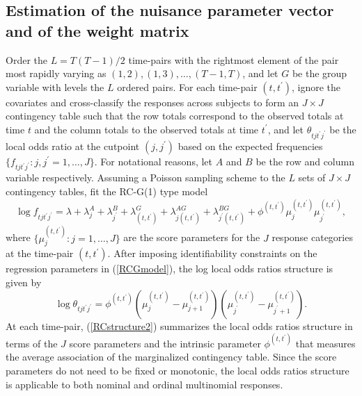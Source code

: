\documentclass[article,shortnames,nojss]{jss}
\begin{document}
\subsection{Estimation of the nuisance parameter vector and of the weight matrix} \label{Alpha}
Order the $L=T(T-1)/2$ time-pairs with the rightmost element of the pair most rapidly varying as $(1,2),(1,3),\ldots,(T-1,T)$, and let $G$ be the group variable with levels the $L$ ordered pairs. For each time-pair $(t,t^{\prime})$, ignore the covariates and cross-classify the responses across subjects to form an $J \times J$ contingency table such that the row totals correspond to the observed totals at time $t$ and the column totals to the observed totals at time $t^{\prime}$, and let $\theta_{tjt^{\prime}j^{\prime}}$ be the local odds ratio at the cutpoint $(j,j^{\prime})$ based on the expected frequencies $\{f_{tjt^{\prime}j^{\prime}}:j,j^{\prime}=1,\ldots,J\}$. For notational reasons, let $A$ and $B$ be the row and column variable respectively. Assuming a Poisson sampling scheme to the $L$ sets of $J \times J$ contingency tables, fit the RC-G(1) type model \citep{Becker1989a}
\begin{equation}
\log f_{tjt^{\prime}j^{\prime}}=\lambda+\lambda^{A}_{j}+\lambda^{B}_{j^{\prime}}+\lambda^{G}_{(t,t^{\prime})}+\lambda^{AG}_{j(t,t^{\prime})}+\lambda^{BG}_{j^{\prime}(t,t^{\prime})}+\phi^{(t,t^{\prime})}\mu^{(t,t^{\prime})}_j \mu^{(t,t^{\prime})}_{j^{\prime}}, 
\label{RCGmodel}
\end{equation}
where $\{\mu^{(t,t^{\prime})}_{j}:j=1,\ldots,J\}$ are the score parameters for the $J$ response categories at the time-pair $(t,t^{\prime})$.
After imposing identifiability constraints on the regression parameters in (\ref{RCGmodel}), the log local odds ratios structure is given by
\begin{equation}
\log \theta_{tjt^{\prime}j^{\prime}}=\phi^{(t,t^{\prime})}\left(\mu^{(t,t^{\prime})}_{j}-\mu^{(t,t^{\prime})}_{j+1}\right)\left(\mu^{(t,t^{\prime})}_{j^{\prime}}-\mu^{(t,t^{\prime})}_{j^{\prime}+1}\right).
\label{RCstructure2}
\end{equation}
At each time-pair, (\ref{RCstructure2}) summarizes the local odds ratios structure in terms of the $J$ score parameters and the intrinsic parameter $\phi^{(t,t^{\prime})}$ that measures the average association of the marginalized contingency table. Since the score parameters do not need to be fixed or monotonic, the local odds ratios structure is applicable to both nominal and ordinal multinomial responses.
 
\end{document}
